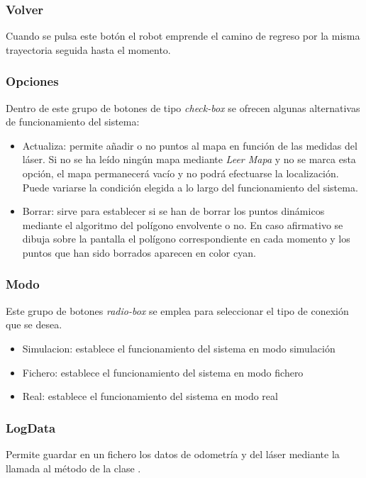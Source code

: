 \subsubsection{Volver}

\noindent
Cuando se pulsa este botón el robot emprende el camino de regreso por la misma trayectoria seguida hasta el momento.

\subsubsection{Opciones}
Dentro de este grupo de botones de tipo \emph{check-box} se ofrecen algunas alternativas de funcionamiento del sistema:
\begin{itemize}
  \item Actualiza: permite añadir o no puntos al mapa en función de las medidas del láser. Si no se ha leído ningún mapa mediante \emph{Leer Mapa} y no se marca esta opción, el mapa permanecerá vacío y no podrá efectuarse la localización. Puede variarse la condición elegida a lo largo del funcionamiento del sistema.
  \item Borrar: sirve para establecer si se han de borrar los puntos dinámicos mediante el algoritmo del polígono envolvente o no. En caso afirmativo se dibuja sobre la pantalla el polígono correspondiente en cada momento y los puntos que han sido borrados aparecen en color cyan.
\end{itemize}

\subsubsection{Modo}
Este grupo de botones \emph{radio-box} se emplea para seleccionar el tipo de conexión que se desea.
\begin{itemize}
  \item Simulacion: establece el funcionamiento del sistema en modo simulación
  \item Fichero: establece el funcionamiento del sistema en modo fichero
  \item Real: establece el funcionamiento del sistema en modo real
\end{itemize}

\subsubsection{LogData}
Permite guardar en un fichero los datos de odometría y del láser mediante la llamada al método  de la clase .

